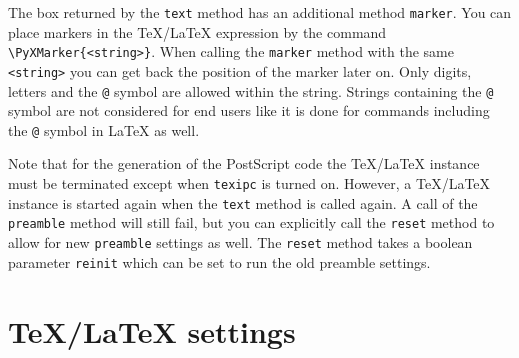 The box returned by the \verb|text| method has an additional method
\verb|marker|. You can place markers in the \TeX/\LaTeX{} expression
by the command \verb|\PyXMarker{<string>}|. When calling the
\verb|marker| method with the same \verb|<string>| you can get back the
position of the marker later on. Only digits, letters and the \verb|@|
symbol are allowed within the string. Strings containing the \verb|@|
symbol are not considered for end users like it is done for commands
including the \verb|@| symbol in \LaTeX{} as well.

Note that for the generation of the PostScript code the \TeX/\LaTeX{}
instance must be terminated except when \verb|texipc| is turned on.
However, a \TeX/\LaTeX{} instance is started again when the
\verb|text| method is called again. A call of the \verb|preamble|
method will still fail, but you can explicitly call the \verb|reset|
method to allow for new \verb|preamble| settings as well. The
\verb|reset| method takes a boolean parameter \verb|reinit| which can
be set to run the old preamble settings.

\section{\TeX/\LaTeX{} settings}

